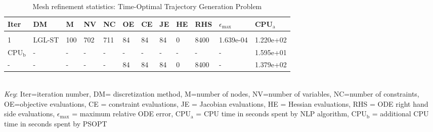 
\begin{table}
\caption{Mesh refinement statistics: Time-Optimal Trajectory Generation Problem}
\label{mesh_stats_traj}
\renewcommand{\tabcolsep}{0.15cm}
\tiny
\begin{tabular}{llllllllllll}
Iter&DM&M&NV&NC&OE&CE&JE&HE&RHS&$\epsilon_{\max}$&CPU$_\mathrm{a}$ \\ \hline \\
1&LGL-ST&100&702&711&84&84&84&0&8400&1.639e-04&1.220e+02\\
\hline
CPU$_\mathrm{b}$ &-&-&-&-&-&-&-&-&-&-&1.595e+01\\
-&-&-&-&-&84&84&84&0&8400&-&1.379e+02\\
\end{tabular}
\newline \\ \emph{Key}: Iter=iteration number, DM= discretization method, M=number of nodes, NV=number of variables, NC=number of constraints, OE=objective evaluations,  	              CE = constraint evaluations, JE = Jacobian evaluations, HE = Hessian evaluations, RHS = ODE right hand side 		      evaluations, $\epsilon_{\max}$ = maximum relative ODE error, CPU$_\mathrm{a}$ = CPU time in seconds spent by NLP algorithm, 		      CPU$_\mathrm{b}$ = additional CPU time in seconds spent by PSOPT
\normalsize
\end{table}